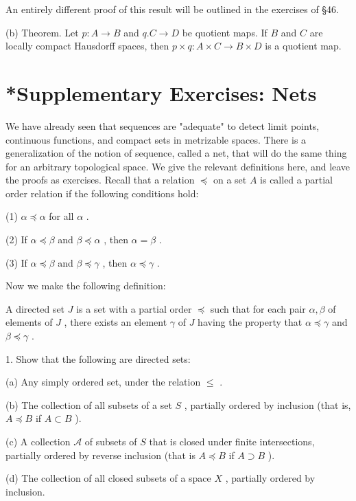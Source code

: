 \documentclass[10pt]{article}
\begin{document}
An entirely different proof of this result will be outlined in the exercises of §46.

(b) Theorem. Let \(p : A \rightarrow  B\) and \(q.C \rightarrow  D\) be quotient maps. If \(B\) and \(C\) are locally compact Hausdorff spaces, then \(p \times  q : A \times  C \rightarrow  B \times  D\) is a quotient map.

\section*{*Supplementary Exercises: Nets}

We have already seen that sequences are "adequate" to detect limit points, continuous functions, and compact sets in metrizable spaces. There is a generalization of the notion of sequence, called a net, that will do the same thing for an arbitrary topological space. We give the relevant definitions here, and leave the proofs as exercises. Recall that a relation \(\preccurlyeq\) on a set \(A\) is called a partial order relation if the following conditions hold:

(1) \(\alpha  \preccurlyeq  \alpha\) for all \(\alpha\) .

(2) If \(\alpha  \preccurlyeq  \beta\) and \(\beta  \preccurlyeq  \alpha\) , then \(\alpha  = \beta\) .

(3) If \(\alpha  \preccurlyeq  \beta\) and \(\beta  \preccurlyeq  \gamma\) , then \(\alpha  \preccurlyeq  \gamma\) .

Now we make the following definition:

A directed set \(J\) is a set with a partial order \(\preccurlyeq\) such that for each pair \(\alpha ,\beta\) of elements of \(J\) , there exists an element \(\gamma\) of \(J\) having the property that \(\alpha  \preccurlyeq  \gamma\) and \(\beta  \preccurlyeq  \gamma\) .

1. Show that the following are directed sets:

(a) Any simply ordered set, under the relation \(\leq\) .

(b) The collection of all subsets of a set \(S\) , partially ordered by inclusion (that is, \(A \preccurlyeq  B\) if \(A \subset  B\) ).

(c) A collection \(\mathcal{A}\) of subsets of \(S\) that is closed under finite intersections, partially ordered by reverse inclusion (that is \(A \preccurlyeq  B\) if \(A \supset  B\) ).

(d) The collection of all closed subsets of a space \(X\) , partially ordered by inclusion.
\end{document}
